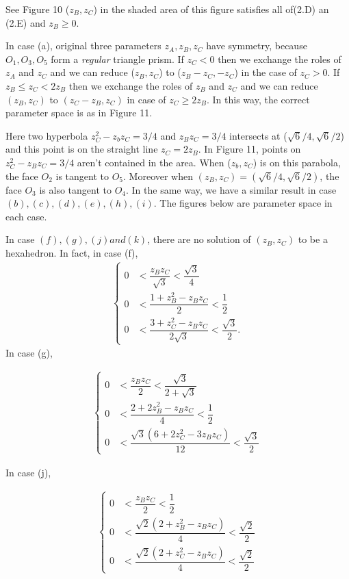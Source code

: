 \documentclass[dvipdfmx]{interact}
\theoremstyle{plain}%
\theoremstyle{definition}
\theoremstyle{remark}
\theoremstyle{problemstyle}
\begin{document}
See Figure 10 ($z_B, z_C$) in the shaded area of this figure satisfies
all of(2.D) an (2.E) and $z_B \geq 0$.

In case (a), original three parameters $z_A, z_B, z_C$ have symmetry,
because $O_1, O_3, O_5$ form a \textit{regular} triangle prism.
If $z_C < 0$ then we exchange the roles of $z_A$ and $z_C$ and we can reduce
($z_B, z_C$) to ($z_B - z_C, -z_C$) in the case of $z_C > 0$.
If $z_B \leq z_C < 2z_B$ then we exchange the roles of $z_B$ and $z_C$
and we can reduce $(z_B, z_C)$ to $(z_C -z_B,z_C)$ in case of 
$z_C \geq 2z_B$. In this way, the correct parameter space is as in Figure
11.

Here two hyperbola $z^2_C - z_bz_C = 3/4$ and $z_B z_C = 3/4$ intersects
at ($\sqrt{6} / 4, \sqrt{6}/2$) and this point is on the straight line
$z_C=2z_B$. In Figure 11, points on $z^2_C - z_Bz_C = 3/4$ aren't
contained in the area. When ($z_b, z_C$) is on this parabola, the face
$O_2$ is tangent to $O_5$. Moreover when
$(z_B, z_C) = (\sqrt{6} / 4, \sqrt{6}/2)$, the face $O_3$ is also tangent
to $O_4$.
In the same way, we have a similar result in case $(b), (c), (d), (e),
(h), (i)$. The figures below are parameter space in each case.

In case $(f), (g), (j) and (k)$, there are no solution of $(z_B, z_C)$
to be a hexahedron. In fact, in case (f),
\begin{align*}
\begin{cases}
 0 &< \dfrac{z_Bz_C}{\sqrt{3}} < \dfrac{\sqrt{3}}{4} \\
 0 &< \dfrac{1 + z^2_B - z_Bz_C}{2} < \dfrac{1}{2} \\
 0 &< \dfrac{3 + z^2_C - z_Bz_C}{2\sqrt{3}} < \dfrac{\sqrt{3}}{2}.
\end{cases}
\end{align*}
In case (g),

\begin{align*}
\begin{cases}
0 &< \dfrac{z_Bz_C}{2} < \dfrac{\sqrt{3}}{2 + \sqrt{3}} \\
0 &< \dfrac{2 + 2z^2_B - z_Bz_C}{4} < \dfrac{1}{2} \\
0 &< \dfrac{\sqrt{3}(6 + 2z^2_C - 3z_Bz_C)}{12} < \dfrac{\sqrt{3}}{2}
\end{cases}
\end{align*}

In case (j),

\begin{align*}
 \begin{cases}
  0 &< \dfrac{z_Bz_C}{2} < \dfrac{1}{2}\\
  0 &< \dfrac{\sqrt{2}(2 + z^2_B - z_B z_C)}{4} < \dfrac{\sqrt{2}}{2}\\
  0 &< \dfrac{\sqrt{2}(2 + z^2_C - z_B z_C)}{4} < \dfrac{\sqrt{2}}{2}
 \end{cases}
\end{align*}
\end{document}
